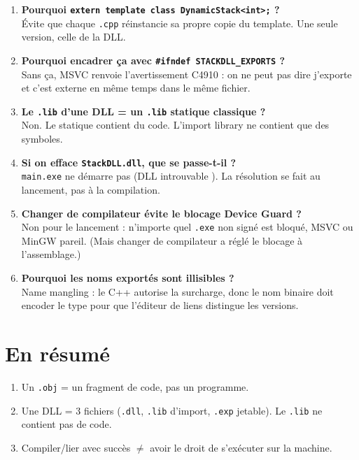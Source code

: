 \documentclass[11pt,a4paper]{article}
\newcommand{\pt}[1]{\textbf{\color{bleu}#1}}
\begin{document}
\begin{enumerate}[label=\pt{Q\arabic*.}]
\item \textbf{Pourquoi \texttt{extern template class DynamicStack<int>;} ?} \\
Évite que chaque \texttt{.cpp} réinstancie sa propre copie du template. Une seule version, celle de la DLL.

\item \textbf{Pourquoi encadrer ça avec \texttt{\#ifndef STACKDLL\_EXPORTS} ?} \\
Sans ça, MSVC renvoie l'avertissement C4910 : on ne peut pas dire \og j'exporte \fg{} et \og c'est externe \fg{} en même temps dans le même fichier.

\item \textbf{Le \texttt{.lib} d'une DLL = un \texttt{.lib} statique classique ?} \\
Non. Le statique contient du code. L'import library ne contient que des symboles.

\item \textbf{Si on efface \texttt{StackDLL.dll}, que se passe-t-il ?} \\
\texttt{main.exe} ne démarre pas (\og DLL introuvable \fg). La résolution se fait au lancement, pas à la compilation.

\item \textbf{Changer de compilateur évite le blocage Device Guard ?} \\
Non pour le lancement : n'importe quel \texttt{.exe} non signé est bloqué, MSVC ou MinGW pareil. (Mais changer de compilateur a réglé le blocage à l'assemblage.)

\item \textbf{Pourquoi les noms exportés sont illisibles ?} \\
Name mangling : le C++ autorise la surcharge, donc le nom binaire doit encoder le type pour que l'éditeur de liens distingue les versions.
\end{enumerate}

\section{En résumé}

\begin{enumerate}
\item Un \texttt{.obj} = un fragment de code, pas un programme.
\item Une DLL = 3 fichiers (\texttt{.dll}, \texttt{.lib} d'import, \texttt{.exp} jetable). Le \texttt{.lib} ne contient pas de code.
\item Compiler/lier avec succès $\neq$ avoir le droit de s'exécuter sur la machine.
\end{enumerate}
\end{document}
